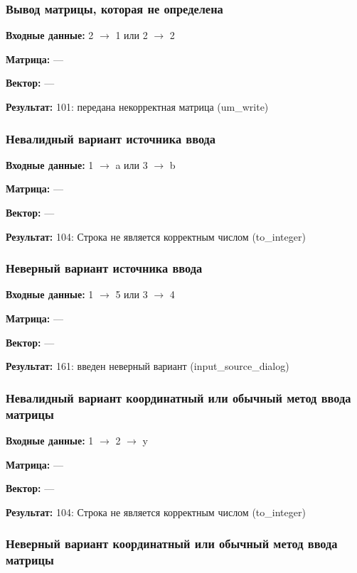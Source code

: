 \documentclass[a4paper,12pt]{extarticle}
\begin{document}
\subsubsection{Вывод матрицы, которая не определена}



\textbf{Входные данные: }
2 $\rightarrow$ 1 или 2 $\rightarrow$ 2

\textbf{Матрица: }
---

\textbf{Вектор: }
---

\textbf{Результат: }
101: передана некорректная матрица (um\_write)

\subsubsection{Невалидный вариант источника ввода}


\textbf{Входные данные: }
1 $\rightarrow$ a или 3 $\rightarrow$ b

\textbf{Матрица: }
---

\textbf{Вектор: }
---

\textbf{Результат: }
104: Строка не является корректным числом (to\_integer)

\subsubsection{Неверный вариант источника ввода}



\textbf{Входные данные: }
1 $\rightarrow$ 5 или 3 $\rightarrow$ 4

\textbf{Матрица: }
---

\textbf{Вектор: }
---

\textbf{Результат: }
161: введен неверный вариант (input\_source\_dialog)

\subsubsection{Невалидный вариант координатный или обычный метод ввода матрицы}



\textbf{Входные данные: }
1 $\rightarrow$ 2 $\rightarrow$ y

\textbf{Матрица: }
---

\textbf{Вектор: }
---

\textbf{Результат: }
104: Строка не является корректным числом (to\_integer)

\subsubsection{Неверный вариант координатный или обычный метод ввода матрицы}
\end{document}
